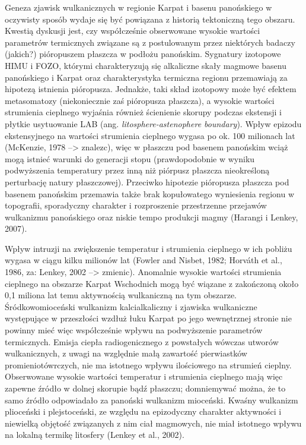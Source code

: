 \documentclass[11.5pt,twoside]{report}
\begin{document}
Geneza zjawisk wulkanicznych w regionie Karpat i basenu panońskiego w oczywisty sposób wydaje się być powiązana z historią tektoniczną tego obszaru. Kwestią dyskusji jest, czy współcześnie obserwowane wysokie wartości parametrów termicznych związane są z postulowanym przez niektórych badaczy (jakich?) pióropuszem płaszcza w podłożu panońskim. Sygnatury izotopowe HIMU i FOZO, którymi charakteryzują się alkaliczne skały magmowe basenu panońskiego i Karpat oraz charakterystyka termiczna regionu przemawiają za hipotezą istnienia pióropusza. Jednakże, taki skład izotopowy może być efektem metasomatozy (niekoniecznie zaś pióropusza płaszcza), a wysokie wartości strumienia cieplnego wyjaśnia również ścienienie skorupy podczas ekstensji i płytkie usytuowanie LAB (ang. \textit{litosphere-astenophere boundary}). Wpływ epizodu ekstensyjnego na wartości strumienia cieplnego wygasa po ok. 100 milionach lat (McKenzie, 1978 --> znalezc), więc w płaszczu pod basenem panońskim wciąż mogą istnieć warunki do generacji stopu (prawdopodobnie w wyniku podwyższenia temperatury przez inną niż piórpusz płaszcza nieokreśloną perturbację natury płaszczowej). Przeciwko hipotezie pióropusza płaszcza pod basenem panońskim przemawia także brak kopułowatego wyniesienia regionu w topografii, sporadyczny charakter i rozproszenie przestrzenne przejawów wulkanizmu panońskiego oraz niskie tempo produkcji magmy (Harangi i Lenkey, 2007).    
  
Wpływ intruzji na zwiększenie temperatur i strumienia cieplnego w ich pobliżu wygasa w ciągu kilku milionów lat (Fowler and Nisbet, 1982; Horv\'{a}th et al., 1986, za: Lenkey, 2002 --> zmienic). Anomalnie wysokie wartości strumienia cieplnego na obszarze Karpat Wschodnich mogą być wiązane z zakończoną około 0,1 miliona lat temu aktywnością wulkaniczną na tym obszarze. Śródkowomioceński wulkanizm kalcialkaliczny i zjawiska wulkaniczne występujące w przeszłości wzdłuż łuku Karpat po jego wewnętrznej stronie nie powinny mieć więc współcześnie wpływu na podwyższenie parametrów termicznych. Emisja ciepła radiogenicznego z powstałych wówczas utworów wulkanicznych, z uwagi na względnie małą zawartość pierwiastków promieniotówrczych, nie ma istotnego wpływu ilościowego na strumień cieplny. Obserwowane wysokie wartości temperatur i strumienia cieplnego mają więc zapewne \'{z}ródło w dolnej skorupie bąd\'{z} płaszczu; domniemywać można, że to samo \'{z}ródło odpowiadało za panoński wulkanizm mioceński. Kwaśny wulkanizm plioceński i plejstoceński, ze względu na epizodyczny charakter aktywności i niewielką objętość związanych z nim ciał magmowych, nie miał istotnego wpływu na lokalną termikę litosfery (Lenkey et al., 2002).
\end{document}
